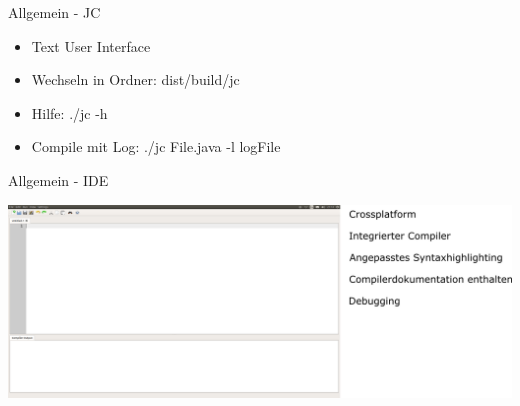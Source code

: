 \begin{frame}{Allgemein - JC}

\begin{itemize}
	\item Text User Interface
	\item Wechseln in Ordner: dist/build/jc
	\item Hilfe: ./jc -h
	\item Compile mit Log: ./jc File.java -l logFile
\end{itemize}

\end{frame}

\begin{frame}{Allgemein - IDE}

\includegraphics{images/allgemein/ide.png}

\end{frame}
